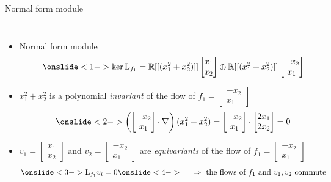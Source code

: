 \documentclass[10pt,T]{beamer}
\begin{document}
\begin{frame}{Normal form module}
\begin{columns}[T,onlytextwidth]
\column{\textwidth}
\begin{itemize}
\item<1-> Normal form module
  \begin{equation*}
    \onslide<1->{\ker\text{L}_{f_1}=\mathbb{R}[[(x_1^2+x_2^2)]]\begin{bmatrix}x_1\\x_2\end{bmatrix}\oplus\mathbb{R}[[(x_1^2+x_2^2)]]\begin{bmatrix}-x_2\\x_1\end{bmatrix}}
  \end{equation*}
  \item<2-> $x_1^2+x_2^2$ is a polynomial \emph{invariant} of the flow of
    $f_1=\begin{bmatrix}-x_2\\x_1\end{bmatrix}$
\begin{equation*}
\onslide<2->{\left( \begin{bmatrix}-x_2\\x_1\end{bmatrix}\cdot\nabla \right)(x_1^2+x_2^2) = \begin{bmatrix}-x_2\\x_1\end{bmatrix}\cdot\begin{bmatrix}2x_1\\2x_2\end{bmatrix}=0}
\end{equation*}
\item<3-> $v_1=\begin{bmatrix}x_1\\x_2\end{bmatrix}$ and
  $v_2=\begin{bmatrix}-x_2\\x_1\end{bmatrix}$ are \emph{equivariants} of the flow of $f_1=\begin{bmatrix}-x_2\\x_1\end{bmatrix}$
\begin{equation*}
\onslide<3->{\text{L}_{f_1}v_{i}=0}\onslide<4->{\hspace{5mm}\Rightarrow\text{ the flows of }f_1\text{ and }v_{1},v_2\text{ commute}}
\end{equation*}
\end{itemize}
\end{columns}
\end{frame}
\end{document}
